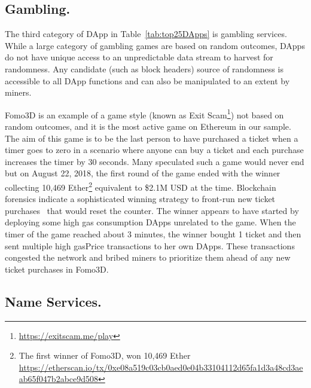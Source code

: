 
\subsection{Gambling.}

The third category of DApp in Table~\ref{tab:top25DApps} is gambling services. While a large category of gambling games are based on random outcomes, DApps do not have unique access to an unpredictable data stream to harvest for randomness. Any candidate (such as block headers) source of randomness is accessible to all DApp functions and can also be manipulated to an extent by miners.

\textsf{Fomo3D} is an example of a game style (known as \textsf{Exit Scam}\footnote{\url{https://exitscam.me/play}}) not based on random outcomes, and it is the most active game on Ethereum in our sample. The aim of this game is to be the last person to have purchased a ticket when a timer goes to zero in a scenario where anyone can buy a ticket and each purchase increases the timer by 30 seconds. Many speculated such a game would never end but on August 22, 2018, the first round of the game ended with the winner collecting 10,469 Ether\footnote{The first winner of Fomo3D, won 10,469 Ether \url{ https://etherscan.io/tx/0xe08a519c03cb0aed0e04b33104112d65fa1d3a48cd3aeab65f047b2abce9d508}} equivalent to \$2.1M USD at the time.
Blockchain forensics indicate a sophisticated winning strategy to front-run new ticket purchases~\cite{fomo3dhacker} that would reset the counter. The winner appears to have started by deploying some high gas consumption DApps unrelated to the game. When the timer of the game reached about 3 minutes, the winner bought 1 ticket and then sent multiple high gasPrice transactions to her own DApps. These transactions congested the network and bribed miners to prioritize them ahead of any new ticket purchases in \textsf{Fomo3D}.



\subsection{Name Services.}\label{sec:ens}

